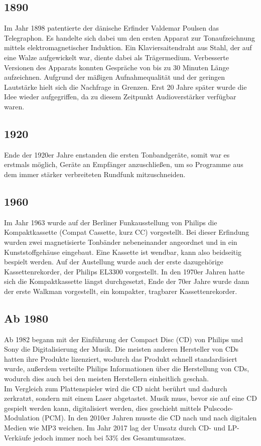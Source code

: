 \documentclass{extarticle}
\begin{document}
		\subsection{1890}
		Im Jahr 1898 patentierte der dänische Erfinder Valdemar Poulsen das Telegraphon. Es handelte sich dabei um den ersten Apparat zur Tonaufzeichnung mittels elektromagnetischer Induktion. Ein Klaviersaitendraht aus Stahl, der auf eine Walze aufgewickelt war, diente dabei als Trägermedium. Verbesserte Versionen des Apparats konnten Gespräche von bis zu 30 Minuten Länge aufzeichnen. Aufgrund der mäßigen Aufnahmequalität  und der geringen Lautstärke hielt sich die Nachfrage in Grenzen. Erst 20 Jahre später wurde die Idee wieder aufgegriffen, da zu diesem Zeitpunkt Audioverstärker verfügbar waren. \cite{Disc3}
		
		\subsection{1920}
		Ende der 1920er Jahre enstanden die ersten Tonbandgeräte, somit war es erstmals möglich, Geräte an Empfänger anzuschließen, um so Programme aus dem immer stärker verbreiteten Rundfunk mitzuschneiden. \cite{Reininger1928}
		
		\subsection{1960}
		Im Jahr 1963 wurde auf der Berliner Funkausstellung von Philips die Kompaktkassette (Compat Cassette, kurz CC) vorgestellt. Bei dieser Erfindung wurden zwei magnetisierte Tonbänder nebeneinander angeordnet und in ein Kunststoffgehäuse eingebaut. Eine Kassette ist wendbar, kann also beidseitig bespielt werden. Auf der Austellung wurde auch der erste dazugehörige Kassettenrekorder, der Philips EL3300 vorgestellt. In den 1970er Jahren hatte sich die Kompaktkassette längst durchgesetzt, Ende der 70er Jahre wurde dann der erste Walkman vorgestellt, ein kompakter, tragbarer Kassettenrekorder. \cite{Disc4}
		
		\subsection{Ab 1980}
		Ab 1982 begann mit der Einführung der Compact Disc (CD) von Philips und Sony die Digitalisierung der Musik. Die meisten anderen Hersteller von CDs hatten ihre Produkte lizenziert, wodurch das Produkt schnell standardisiert wurde, außerdem verteilte Philips Informationen über die Herstellung von CDs, wodurch dies auch bei den meisten Herstellern einheitlich geschah. \cite{CDeins} \\
		Im Vergleich zum Plattenspieler wird die CD nicht berührt und dadurch zerkratzt, sondern mit einem Laser abgetastet. Musik muss, bevor sie auf eine CD gespielt werden kann, digitalisiert werden, dies geschieht mittels Pulscode-Modulation (PCM). In den 2010er Jahren musste die CD nach und nach digitalen Medien wie MP3 weichen. Im Jahr 2017 lag der Umsatz durch CD- und LP-Verkäufe jedoch immer noch bei 53\% des Gesamtumsatzes. \cite{CDzwei}
		
\end{document}
